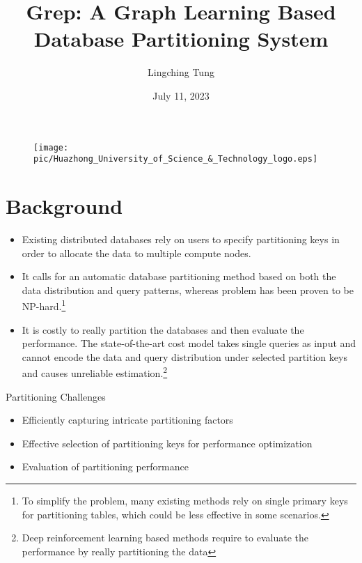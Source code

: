 \documentclass{beamer}
\author{Lingching Tung}
\title{Grep: A Graph Learning Based Database Partitioning System}
\subtitle{}
\institute{Intelligence Data Storage And Management Laboratory}
\date{July 11, 2023}
\begin{document}
\kaishu
\begin{frame}
    \titlepage
    \begin{figure}[htpb]
        \begin{center}
            \texttt{[image: pic/Huazhong\_University\_of\_Science\_\&\_Technology\_logo.eps]}
        \end{center}
    \end{figure}
\end{frame}

\begin{frame}
    \tableofcontents[sectionstyle=show,subsectionstyle=show/shaded/hide,subsubsectionstyle=show/shaded/hide]
\end{frame}

\section{Background}
\begin{frame}
    \begin{itemize}[<+-| alert@+>]
        \item Existing distributed databases rely on users to specify partitioning keys in order to allocate the data to multiple compute nodes.

        \item It calls for an automatic database partitioning method based on both the data distribution and query patterns, whereas problem has been proven to be NP-hard.{\footnote{To simplify the problem, many existing methods rely on single primary keys for partitioning tables, which could be less effective in some scenarios.}}

        \item It is costly to really partition the databases and then evaluate the performance. The state-of-the-art cost model takes single queries as input and cannot encode the data and query distribution under selected partition keys and causes unreliable estimation.{\footnote{Deep reinforcement learning based methods require to evaluate the performance by really partitioning the data}}
    \end{itemize}
\end{frame}

\begin{frame}{Partitioning Challenges}
    \begin{itemize}
        \item Efficiently capturing intricate partitioning factors
        \item Effective selection of partitioning keys for performance optimization
        \item Evaluation of partitioning performance
    \end{itemize}
\end{frame}
\end{document}
